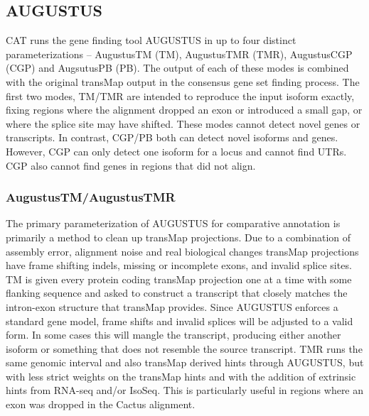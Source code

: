 \documentclass[fleqn,10pt]{wlscirep}
\begin{document}
\subsection{AUGUSTUS}
	CAT runs the gene finding tool AUGUSTUS in up to four distinct parameterizations -- AugustusTM (TM), AugustusTMR (TMR), AugustusCGP (CGP) and AugsutusPB (PB). The output of each of these modes is combined with the original transMap output in the consensus gene set finding process. The first two modes, TM/TMR are intended to reproduce the input isoform exactly, fixing regions where the alignment dropped an exon or introduced a small gap, or where the splice site may have shifted. These modes cannot detect novel genes or transcripts. In contrast, CGP/PB both can detect novel isoforms and genes. However, CGP can only detect one isoform for a locus and cannot find UTRs. CGP also cannot find genes in regions that did not align. 
    
\subsubsection{AugustusTM/AugustusTMR}
	The primary parameterization of AUGUSTUS for comparative annotation is primarily a method to clean up transMap projections. Due to a combination of assembly error, alignment noise and real biological changes transMap projections have frame shifting indels, missing or incomplete exons, and invalid splice sites. TM is given every protein coding transMap projection one at a time with some flanking sequence and asked to construct a transcript that closely matches the intron-exon structure that transMap provides. Since AUGUSTUS enforces a standard gene model, frame shifts and invalid splices will be adjusted to a valid form. In some cases this will mangle the transcript, producing either another isoform or something that does not resemble the source transcript. TMR runs the same genomic interval and also transMap derived hints through AUGUSTUS, but with less strict weights on the transMap hints and with the addition of extrinsic hints from RNA-seq and/or IsoSeq. This is particularly useful in regions where an exon was dropped in the Cactus alignment.
    
\end{document}
